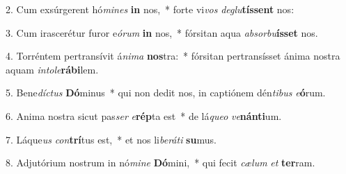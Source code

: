2. Cum exsúrgerent hó\textit{mi}\textit{nes} \textbf{in} nos,~*  forte vi\textit{vos} \textit{de}\textit{glu}\textbf{tís}\textbf{sent} nos:\

3. Cum irascerétur furor e\textit{ó}\textit{rum} \textbf{in} nos,~*  fórsitan aqua \textit{ab}\textit{sor}\textit{bu}\textbf{ís}\textbf{set} nos.\

4. Torréntem pertransívit á\textit{ni}\textit{ma} \textbf{nos}tra:~*  fórsitan pertransísset ánima nostra aquam \textit{in}\textit{to}\textit{le}\textbf{rá}\textbf{bi}lem.\

5. Bene\textit{díc}\textit{tus} \textbf{Dó}minus~*  qui non dedit nos, in captiónem dén\textit{ti}\textit{bus} \textit{e}\textbf{ó}rum.\

6. Anima nostra sicut pas\textit{ser} \textit{e}\textbf{rép}ta est~*  de lá\textit{que}\textit{o} \textit{ve}\textbf{nán}\textbf{ti}um.\

7. Láque\textit{us} \textit{con}\textbf{trí}tus est,~*  et nos li\textit{be}\textit{rá}\textit{ti} \textbf{su}mus.\

8. Adjutórium nostrum in nó\textit{mi}\textit{ne} \textbf{Dó}mini,~*  qui fecit \textit{cæ}\textit{lum} \textit{et} \textbf{ter}ram.\


